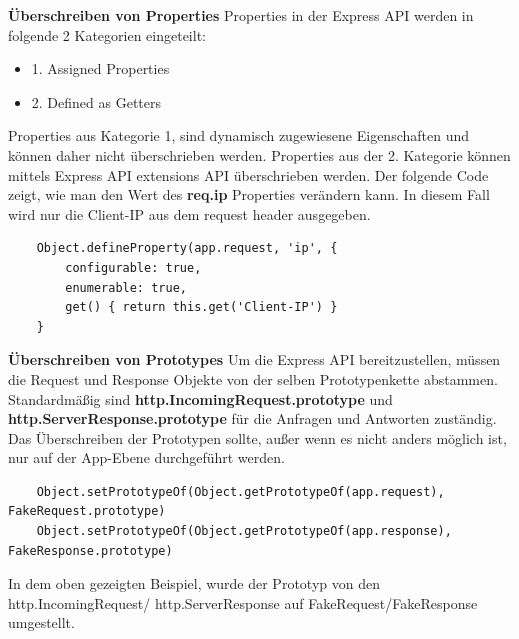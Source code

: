 \textbf{Überschreiben von Properties}
\newline
Properties in der Express API werden in folgende 2 Kategorien eingeteilt: 
\begin{itemize}
    \item 1. Assigned Properties
    \item 2. Defined as Getters
\end{itemize}
Properties aus Kategorie 1, sind dynamisch zugewiesene Eigenschaften und können daher nicht überschrieben werden. Properties aus der 2. Kategorie können mittels Express API extensions API überschrieben werden. Der folgende Code zeigt, wie man den Wert des \textbf{req.ip} Properties verändern kann. In diesem Fall wird nur die Client-IP aus dem request header ausgegeben.
\begin{lstlisting}
    Object.defineProperty(app.request, 'ip', {
        configurable: true,
        enumerable: true,
        get() { return this.get('Client-IP') }
    }
\end{lstlisting}

\textbf{Überschreiben von Prototypes}
\newline
Um die Express API bereitzustellen, müssen die Request und Response Objekte von der selben Prototypenkette abstammen. Standardmäßig sind \textbf{http.IncomingRequest.prototype} und \textbf{http.ServerResponse.prototype} für die Anfragen und Antworten zuständig. Das Überschreiben der Prototypen sollte, außer wenn es nicht anders möglich ist, nur auf der App-Ebene durchgeführt werden.
\begin{lstlisting}
    Object.setPrototypeOf(Object.getPrototypeOf(app.request), FakeRequest.prototype)
    Object.setPrototypeOf(Object.getPrototypeOf(app.response), FakeResponse.prototype)
\end{lstlisting}
In dem oben gezeigten Beispiel, wurde der Prototyp von den http.IncomingRequest/ http.ServerResponse auf FakeRequest/FakeResponse umgestellt.
\cite{Express_js_overriding_api}

